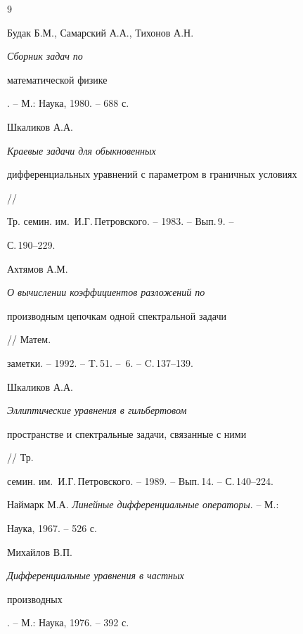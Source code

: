 \begin{thebibliography}{9} 


 




Будак Б.М., Самарский А.А., Тихонов А.Н. {\em Сборник задач по  


математической физике}. -- М.: Наука, 1980. -- 688 с.  




Шкаликов А.А. {\em Краевые задачи для обыкновенных  


дифференциальных уравнений с параметром в граничных условиях} // 


Тр. семин. им.~И.Г.\,Петровского. -- 1983. -- Вып.\,9. -- 


С.\,190--229.  




Ахтямов А.М. {\em О вычислении коэффициентов разложений по  


производным цепочкам одной спектральной задачи} // Матем. 


заметки. -- 1992. -- T.\,51. -- \No\,6. -- C.\,137--139.  




Шкаликов А.А. {\em Эллиптические уравнения в гильбертовом  


пространстве и спектральные задачи, связанные с ними} // Тр. 


семин. им.~И.Г.\,Петровского. -- 1989. -- Вып.\,14. -- С.\,140--224.  




Наймарк М.А. {\em Линейные дифференциальные операторы}. -- М.: 


Наука, 1967. -- 526 с. 




Михайлов В.П. {\em Дифференциальные уравнения в частных  


производных}. -- М.: Наука, 1976. -- 392 с.  


  


\end{thebibliography} 


 


\vskip 0.5cm 


 






 


\label{end} 


 





